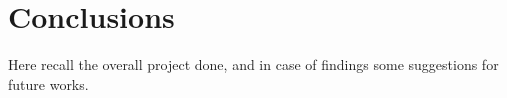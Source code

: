 \chapter{Conclusions}

Here recall the overall project done, and in case of findings some suggestions for future works.\\